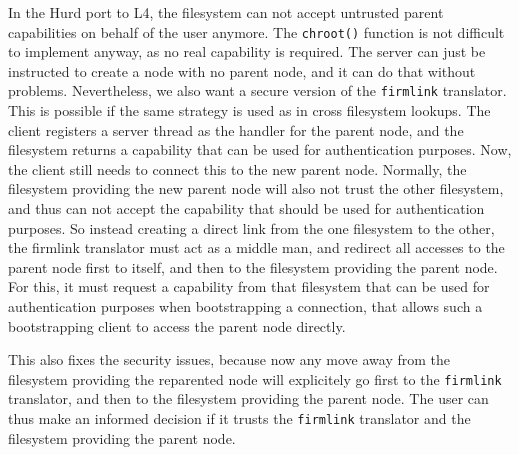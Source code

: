 In the Hurd port to L4, the filesystem can not accept untrusted parent
capabilities on behalf of the user anymore.  The \texttt{chroot()}
function is not difficult to implement anyway, as no real capability
is required.  The server can just be instructed to create a node with
no parent node, and it can do that without problems.  Nevertheless, we
also want a secure version of the \texttt{firmlink} translator.  This
is possible if the same strategy is used as in cross filesystem
lookups.  The client registers a server thread as the handler for the
parent node, and the filesystem returns a capability that can be used
for authentication purposes.  Now, the client still needs to connect
this to the new parent node.  Normally, the filesystem providing the
new parent node will also not trust the other filesystem, and thus can
not accept the capability that should be used for authentication
purposes.  So instead creating a direct link from the one filesystem
to the other, the firmlink translator must act as a middle man, and
redirect all accesses to the parent node first to itself, and then to
the filesystem providing the parent node.  For this, it must request a
capability from that filesystem that can be used for authentication
purposes when bootstrapping a connection, that allows such a
bootstrapping client to access the parent node directly.

This also fixes the security issues, because now any move away from
the filesystem providing the reparented node will explicitely go first
to the \texttt{firmlink} translator, and then to the filesystem
providing the parent node.  The user can thus make an informed
decision if it trusts the \texttt{firmlink} translator and the
filesystem providing the parent node.

\begin{comment}
  This is a good example where the redesign of the IPC system forces
  us to fix a security issue and provides a deeper insight into the
  trust issues and how to solve them.
\end{comment}


